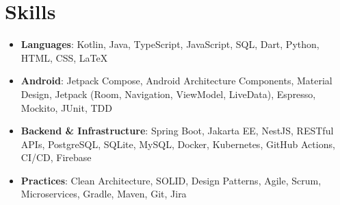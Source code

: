\documentclass[letterpaper,11pt]{article}
\newcommand{\resumeSubHeadingListStart}{\begin{itemize}[leftmargin=*]}
\newcommand{\resumeSubHeadingListEnd}{\end{itemize}}
\begin{document}
\section{Skills}
\resumeSubHeadingListStart
\item{
      \textbf{Languages}{: Kotlin, Java, TypeScript, JavaScript, SQL, Dart, Python, HTML, CSS, LaTeX}
      }
\item{
      \textbf{Android}{: Jetpack Compose, Android Architecture Components, Material Design, Jetpack (Room, Navigation, ViewModel, LiveData), Espresso, Mockito, JUnit, TDD}
      }
\item{
      \textbf{Backend \& Infrastructure}{: Spring Boot, Jakarta EE, NestJS, RESTful APIs, PostgreSQL, SQLite, MySQL, Docker, Kubernetes, GitHub Actions, CI/CD, Firebase}
      }
\item{
      \textbf{Practices}{: Clean Architecture, SOLID, Design Patterns, Agile, Scrum, Microservices, Gradle, Maven, Git, Jira}
      }
\resumeSubHeadingListEnd


\end{document}
